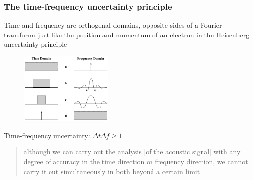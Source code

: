 \documentclass[usenames,dvipsnames]{beamer}
\begin{document}
\begin{frame}
	\frametitle{The time-frequency uncertainty principle}
	Time and frequency are orthogonal domains, opposite sides of a Fourier transform: just like the position and momentum of an electron in the Heisenberg uncertainty principle
	\begin{figure}
		\vspace{-0.5em}
		\includegraphics[height=3.5cm]{./images-tftheory/gabor13.png}
		\vspace{-0.25em}
	\end{figure}
	    Time-frequency uncertainty: $\Delta t\Delta f \ge 1 $
	    \begin{quote}
		    although we can carry out the analysis [of the acoustic signal] with any degree of accuracy in the time direction or frequency direction, we cannot carry it out simultaneously in both beyond a certain limit
	    \end{quote}
\end{frame}
\end{document}
